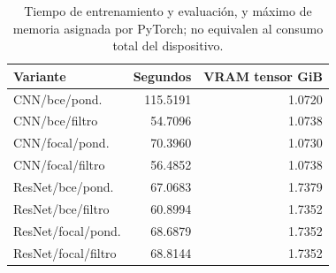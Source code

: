 \begin{table}[ht]
\centering\small
\caption{Tiempo de entrenamiento y evaluación, y máximo de memoria asignada por PyTorch; no equivalen al consumo total del dispositivo.}
\begin{tabular}{lrr}
\toprule
Variante & Segundos & VRAM tensor GiB \\
\midrule
CNN/bce/pond. & 115.5191 & 1.0720 \\
CNN/bce/filtro & 54.7096 & 1.0738 \\
CNN/focal/pond. & 70.3960 & 1.0730 \\
CNN/focal/filtro & 56.4852 & 1.0738 \\
ResNet/bce/pond. & 67.0683 & 1.7379 \\
ResNet/bce/filtro & 60.8994 & 1.7352 \\
ResNet/focal/pond. & 68.6879 & 1.7352 \\
ResNet/focal/filtro & 68.8144 & 1.7352 \\
\bottomrule
\end{tabular}
\end{table}
